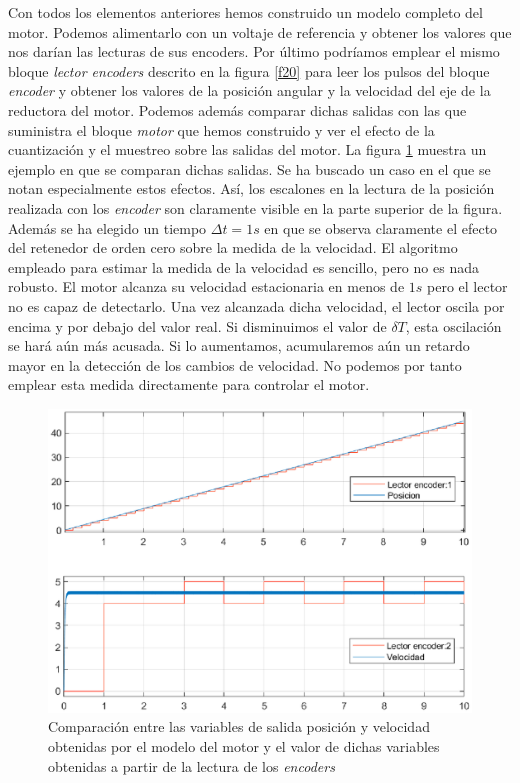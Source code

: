 \documentclass[10pt,a4paper]{report}
\begin{document}
Con todos los elementos anteriores hemos construido un modelo completo del motor. Podemos alimentarlo con un voltaje de referencia y obtener los valores que nos darían las lecturas de sus encoders. Por último podríamos emplear el mismo bloque \emph{lector encoders} descrito en la figura \ref{f20} para leer los pulsos del bloque \emph{encoder} y obtener los valores de la posición angular y la velocidad del eje de la reductora del motor. Podemos además comparar dichas salidas con las que suministra el bloque \emph{motor} que hemos construido y ver el efecto de la cuantización y el muestreo sobre las salidas del motor. La figura \ref{f30} muestra un ejemplo en que se comparan dichas salidas. Se ha buscado un caso en el que se notan especialmente estos efectos. Así, los escalones en la lectura de la posición realizada con los \emph{encoder} son claramente visible en la parte superior de la figura. Además se ha elegido un tiempo $\Delta t = 1s$ en que se observa claramente el efecto del retenedor de orden cero sobre la medida de la velocidad. El algoritmo empleado para estimar la medida de la velocidad es sencillo, pero no es nada robusto. El motor alcanza su velocidad estacionaria en menos de $1s$ pero el lector no es capaz de detectarlo. Una vez alcanzada dicha velocidad, el lector oscila por encima y por debajo del valor real. Si disminuimos el valor de $\delta T$, esta oscilación se hará aún más acusada. Si lo aumentamos, acumularemos aún un retardo mayor en la detección de los cambios de velocidad. No podemos por tanto emplear esta medida directamente para controlar el motor.

\begin{figure}
\centering
\includegraphics[scale=0.6]{salida_modelo.eps}
\caption{Comparación entre las variables de salida posición y velocidad obtenidas por el modelo del motor y el valor de dichas variables obtenidas a partir de la lectura de los \emph{encoders}}
\label{f30}
\end{figure}
\end{document}

